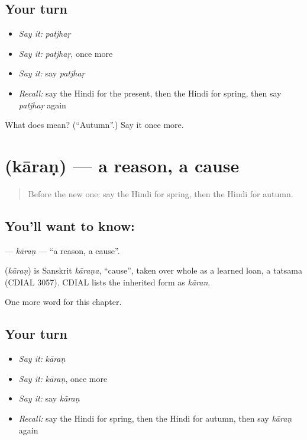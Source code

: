\subsection*{Your turn}
\begin{itemize}
\raggedright
  \item \emph{Say it:} \emph{patjhaṛ}
  \item \emph{Say it:} \emph{patjhaṛ}, once more
  \item \emph{Say it:} say \emph{patjhaṛ}
  \item \emph{Recall:} say the Hindi for the present, then the Hindi for spring, then say \emph{patjhaṛ} again
\end{itemize}

\begin{tcolorbox}[breakable,colback=teal!4,colframe=teal!35!black,title={Before you move on}]
What does  mean? (\textquotedblleft{}Autumn\textquotedblright{}.) Say it once more.
\end{tcolorbox}
\section[\texorpdfstring{\hi{कारण} (kāraṇ)}{कारण (kāraṇ)}]{ (kāraṇ) — a reason, a cause}

\label{lesson:HI-C222-karan}



\begin{quote}
Before the new one: say the Hindi for spring, then the Hindi for autumn.
\end{quote}

\subsection*{You'll want to know: }
\textbf{} — \emph{kāraṇ} — \textquotedblleft{}a reason, a cause\textquotedblright{}.

\begin{cousinweb}
\textbf{} (\emph{kāraṇ}) is Sanskrit \emph{kāraṇa}, \textquotedblleft{}cause\textquotedblright{}, taken over whole as a learned loan, a tatsama (CDIAL 3057). CDIAL lists the inherited form as \emph{kāran}.
\end{cousinweb}

\begin{grammarlens}[title={What you've built}]
One more word for this chapter.
\end{grammarlens}

\subsection*{Your turn}
\begin{itemize}
\raggedright
  \item \emph{Say it:} \emph{kāraṇ}
  \item \emph{Say it:} \emph{kāraṇ}, once more
  \item \emph{Say it:} say \emph{kāraṇ}
  \item \emph{Recall:} say the Hindi for spring, then the Hindi for autumn, then say \emph{kāraṇ} again
\end{itemize}

